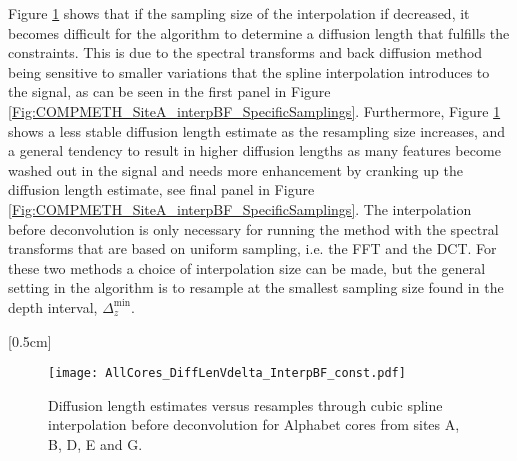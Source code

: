 \documentclass[../../CompleteThesis2/Complete_2ndDraft]{subfiles}
\begin{document}
Figure \ref{Fig:COMPMETH_SamplingVsDiffLen_interpBF} shows that if the sampling size of the interpolation if decreased, it becomes difficult for the algorithm to determine a diffusion length that fulfills the constraints. This is due to the spectral transforms and back diffusion method being sensitive to smaller variations that the spline interpolation introduces to the signal, as can be seen in the first panel in Figure \ref{Fig:COMPMETH_SiteA_interpBF_SpecificSamplings}. Furthermore, Figure \ref{Fig:COMPMETH_SamplingVsDiffLen_interpBF} shows a less stable diffusion length estimate as the resampling size increases, and a general tendency to result in higher diffusion lengths as many features become washed out in the signal and needs more enhancement by cranking up the diffusion length estimate, see final panel in Figure \ref{Fig:COMPMETH_SiteA_interpBF_SpecificSamplings}. The interpolation before deconvolution is only necessary for running the method with the spectral transforms that are based on uniform sampling, i.e. the FFT and the DCT. For these two methods a choice of interpolation size can be made, but the general setting in the algorithm is to resample at the smallest sampling size found in the depth interval, $\Delta_z^{\text{min}}$.

[0.5cm]%
\begin{figure}[!htb]
	\centering
	\texttt{[image: AllCores\_DiffLenVdelta\_InterpBF\_const.pdf]}
	\caption[Diffusion length versus resampling size before deconvolution, all cores.]{\small Diffusion length estimates versus resamples through cubic spline interpolation before deconvolution for Alphabet cores from sites A, B, D, E and G.}
	\label{Fig:COMPMETH_SamplingVsDiffLen_interpBF}
\end{figure}
\end{document}
